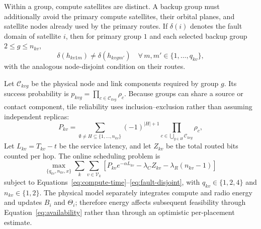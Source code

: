 \documentclass[conference]{IEEEtran}
\begin{document}
Within a group, compute satellites are distinct. A backup group must
additionally avoid the primary compute satellites, their orbital planes, and
satellite nodes already used by the primary routes. If $\delta(i)$ denotes the
fault domain of satellite $i$, then for primary group $1$ and each selected
backup group $2\le g\le n_{kv}$,
\begin{equation}
\delta(h_{kv1m})\ne\delta(h_{kvgm'})
\quad \forall\,m,m'\in\{1,\ldots,q_{kv}\},
\label{eq:fault-disjoint}
\end{equation}
with the analogous node-disjoint condition on their routes.

Let $\mathcal{C}_{kvg}$ be the physical node and link components required by
group $g$. Its success probability is
$p_{kvg}=\prod_{c\in\mathcal{C}_{kvg}}\rho_c$. Because groups can share a
source or contact component, tile reliability uses inclusion--exclusion rather
than assuming independent replicas:
\begin{equation}
 P_{kv}=
 \sum_{\emptyset\ne H\subseteq\{1,\ldots,n_{kv}\}}
 (-1)^{|H|+1}
 \prod_{c\in\bigcup_{g\in H}\mathcal{C}_{kvg}}\rho_c ,
 \label{eq:tile-reliability}
\end{equation}
Let $L_{kv}=T_{kv}-t$ be the service latency, and let $Z_{kv}$ be the total
routed bits counted per hop. The online scheduling problem is
\begin{equation}
 \max_{\{q_{kv},n_{kv},x\}}
 \sum_{k}\sum_{v\in\mathcal{V}_k}
 \left[
 P_{kv}e^{-\alpha L_{kv}}
 -\lambda_C Z_{kv}
 -\lambda_R(n_{kv}-1)
 \right]
\label{eq:objective}
\end{equation}
subject to Equations~\eqref{eq:compute-time}--\eqref{eq:fault-disjoint}, with
$q_{kv}\in\{1,2,4\}$ and $n_{kv}\in\{1,2\}$. The physical model separately
integrates compute and radio energy and updates $B_i$ and $\Theta_i$; therefore
energy affects subsequent feasibility through Equation~\eqref{eq:availability}
rather than through an optimistic per-placement estimate.



\end{document}
